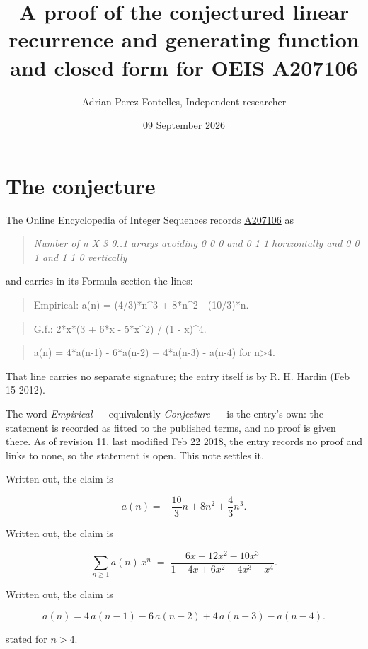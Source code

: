 \documentclass[11pt]{article}
\title{A proof of the conjectured linear recurrence and generating function and closed form for OEIS A207106}
\author{Adrian Perez Fontelles, Independent researcher}
\date{09 September 2026}
\theoremstyle{definition}
\begin{document}
\maketitle
\section{The conjecture}

The Online Encyclopedia of Integer Sequences records \href{https://oeis.org/A207106}{A207106} as

\begin{quote}\itshape Number of n X 3 0..1 arrays avoiding 0 0 0 and 0 1 1 horizontally and 0 0 1 and 1 1 0 vertically\end{quote}

and carries in its Formula section the lines:

\begin{quote}\ttfamily Empirical: a(n) = (4/3)*n\textasciicircum{}3 + 8*n\textasciicircum{}2 - (10/3)*n.\end{quote}

\begin{quote}\ttfamily G.f.: 2*x*(3 + 6*x - 5*x\textasciicircum{}2) / (1 - x)\textasciicircum{}4.\end{quote}

\begin{quote}\ttfamily a(n) = 4*a(n-1) - 6*a(n-2) + 4*a(n-3) - a(n-4) for n>4.\end{quote}

That line carries no separate signature; the entry itself is by R. H. Hardin (Feb 15 2012).

The word {\itshape Empirical} --- equivalently {\itshape Conjecture} --- is the entry's own: the statement is recorded as fitted to the published terms, and no proof is given there. As of revision 11, last modified Feb 22 2018, the entry records no proof and links to none, so the statement is open. This note settles it.

Written out, the claim is

\[a(n) = -\frac{10}{3}n + 8n^{2} + \frac{4}{3}n^{3}.\]

Written out, the claim is

\[\sum_{n \ge 1} a(n)\,x^n \;=\; \frac{6x + 12x^{2} - 10x^{3}}{1 - 4x + 6x^{2} - 4x^{3} + x^{4}}.\]

Written out, the claim is

\[a(n) = 4\,a(n-1) - 6\,a(n-2) + 4\,a(n-3) - a(n-4).\]

stated for $n > 4$.
\end{document}

